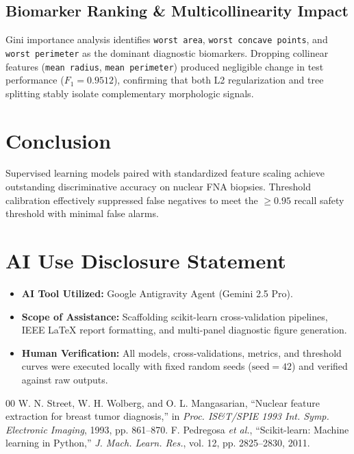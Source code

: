 \documentclass[conference]{IEEEtran}
\begin{document}
\subsection{Biomarker Ranking & Multicollinearity Impact}
Gini importance analysis identifies \texttt{worst area}, \texttt{worst concave points}, and \texttt{worst perimeter} as the dominant diagnostic biomarkers. Dropping collinear features (\texttt{mean radius}, \texttt{mean perimeter}) produced negligible change in test performance ($F_1=0.9512$), confirming that both L2 regularization and tree splitting stably isolate complementary morphologic signals.

\section{Conclusion}
Supervised learning models paired with standardized feature scaling achieve outstanding discriminative accuracy on nuclear FNA biopsies. Threshold calibration effectively suppressed false negatives to meet the $\ge 0.95$ recall safety threshold with minimal false alarms.

\newpage
\section*{AI Use Disclosure Statement}
\begin{itemize}
\item \textbf{AI Tool Utilized:} Google Antigravity Agent (Gemini 2.5 Pro).
\item \textbf{Scope of Assistance:} Scaffolding scikit-learn cross-validation pipelines, IEEE LaTeX report formatting, and multi-panel diagnostic figure generation.
\item \textbf{Human Verification:} All models, cross-validations, metrics, and threshold curves were executed locally with fixed random seeds ($\text{seed}=42$) and verified against raw outputs.
\end{itemize}

\begin{thebibliography}{00}
 W. N. Street, W. H. Wolberg, and O. L. Mangasarian, ``Nuclear feature extraction for breast tumor diagnosis,'' in \textit{Proc. IS\&T/SPIE 1993 Int. Symp. Electronic Imaging}, 1993, pp. 861--870.
 F. Pedregosa \textit{et al.}, ``Scikit-learn: Machine learning in Python,'' \textit{J. Mach. Learn. Res.}, vol. 12, pp. 2825--2830, 2011.
\end{thebibliography}
\end{document}
